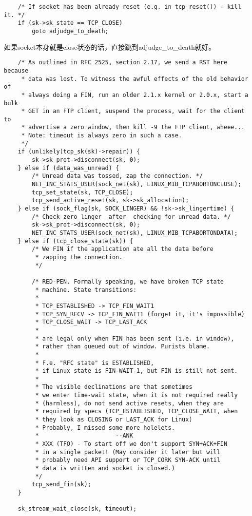 \begin{verbatim}
    /* If socket has been already reset (e.g. in tcp_reset()) - kill it. */
    if (sk->sk_state == TCP_CLOSE)
        goto adjudge_to_death;
\end{verbatim}

        如果socket本身就是close状态的话，直接跳到adjudge\_to\_death就好。

\begin{verbatim}
    /* As outlined in RFC 2525, section 2.17, we send a RST here because
     * data was lost. To witness the awful effects of the old behavior of
     * always doing a FIN, run an older 2.1.x kernel or 2.0.x, start a bulk
     * GET in an FTP client, suspend the process, wait for the client to
     * advertise a zero window, then kill -9 the FTP client, wheee...
     * Note: timeout is always zero in such a case.
     */
    if (unlikely(tcp_sk(sk)->repair)) {
        sk->sk_prot->disconnect(sk, 0);
    } else if (data_was_unread) {
        /* Unread data was tossed, zap the connection. */
        NET_INC_STATS_USER(sock_net(sk), LINUX_MIB_TCPABORTONCLOSE);
        tcp_set_state(sk, TCP_CLOSE);
        tcp_send_active_reset(sk, sk->sk_allocation);
    } else if (sock_flag(sk, SOCK_LINGER) && !sk->sk_lingertime) {
        /* Check zero linger _after_ checking for unread data. */
        sk->sk_prot->disconnect(sk, 0);
        NET_INC_STATS_USER(sock_net(sk), LINUX_MIB_TCPABORTONDATA);
    } else if (tcp_close_state(sk)) {
        /* We FIN if the application ate all the data before
         * zapping the connection.
         */

        /* RED-PEN. Formally speaking, we have broken TCP state
         * machine. State transitions:
         *
         * TCP_ESTABLISHED -> TCP_FIN_WAIT1
         * TCP_SYN_RECV -> TCP_FIN_WAIT1 (forget it, it's impossible)
         * TCP_CLOSE_WAIT -> TCP_LAST_ACK
         *
         * are legal only when FIN has been sent (i.e. in window),
         * rather than queued out of window. Purists blame.
         *
         * F.e. "RFC state" is ESTABLISHED,
         * if Linux state is FIN-WAIT-1, but FIN is still not sent.
         *
         * The visible declinations are that sometimes
         * we enter time-wait state, when it is not required really
         * (harmless), do not send active resets, when they are
         * required by specs (TCP_ESTABLISHED, TCP_CLOSE_WAIT, when
         * they look as CLOSING or LAST_ACK for Linux)
         * Probably, I missed some more holelets.
         *                      --ANK
         * XXX (TFO) - To start off we don't support SYN+ACK+FIN
         * in a single packet! (May consider it later but will
         * probably need API support or TCP_CORK SYN-ACK until
         * data is written and socket is closed.)
         */
        tcp_send_fin(sk);
    }

    sk_stream_wait_close(sk, timeout);
\end{verbatim}

